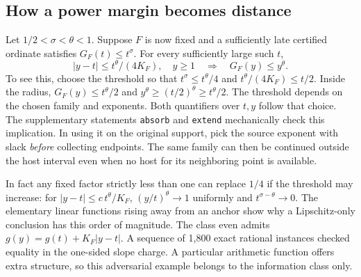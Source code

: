 \documentclass[12pt,letterpaper]{article}
\begin{document}
\subsection{How a power margin becomes distance}
Let \(1/2<\sigma<\theta<1\). Suppose \(F\) is now fixed and a sufficiently late certified ordinate satisfies \(G_F(t)\le t^\sigma\). For every sufficiently large such \(t\),
\begin{equation}\label{eq:collar}
 |y-t|\le t^\theta/(4K_F),\quad y\ge1
 \quad\Longrightarrow\quad G_F(y)\le y^\theta .
\end{equation}
To see this, choose the threshold so that \(t^\sigma\le t^\theta/4\) and \(t^\theta/(4K_F)\le t/2\). Inside the radius, \(G_F(y)\le t^\theta/2\) and \(y^\theta\ge(t/2)^\theta\ge t^\theta/2\). The threshold depends on the chosen family and exponents. Both quantifiers over \(t,y\) follow that choice. The supplementary statements \texttt{absorb} and \texttt{extend} mechanically check this implication. In using it on the original support, pick the source exponent with slack \emph{before} collecting endpoints. The same family can then be continued outside the host interval even when no host for its neighboring point is available.

In fact any fixed factor strictly less than one can replace \(1/4\) if the threshold may increase: for \(|y-t|\le c\,t^\theta/K_F\), \((y/t)^\theta\to1\) uniformly and \(t^{\sigma-\theta}\to0\). The elementary linear functions rising away from an anchor show why a Lipschitz-only conclusion has this order of magnitude. The class even admits \(g(y)=g(t)+K_F|y-t|\). A sequence of 1,800 exact rational instances checked equality in the one-sided slope charge. A particular arithmetic function offers extra structure, so this adversarial example belongs to the information class only.
\end{document}
